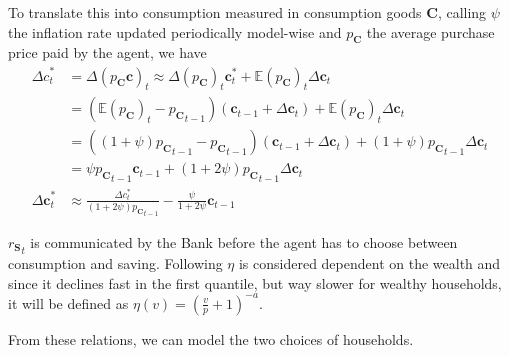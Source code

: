 \documentclass[a4paper, headings=standardclasses]{scrartcl}
\begin{document}
To translate this into consumption measured in consumption goods $\mathbf{C}$, calling $\psi$ the inflation rate updated periodically model-wise and $p_\mathbf{C}$ the average purchase price paid by the agent, we have
\begin{align*}
	{\Delta c}^*_t          & = \Delta (p_\mathbf{C} \mathbf{c})_t \approx \Delta(p_\mathbf{C})_t \mathbf{c}^*_t + \mathbb{E}(p_\mathbf{C})_t {\Delta \mathbf{c}}_t                   \\
	                        & = (\mathbb{E}(p_\mathbf{C})_t - {p_\mathbf{C}}_{t-1}) (\mathbf{c}_{t-1} + {\Delta \mathbf{c}}_t) + \mathbb{E}(p_\mathbf{C})_t {\Delta \mathbf{c}}_t     \\
	                        & = ((1+\psi){p_\mathbf{C}}_{t-1} - {p_\mathbf{C}}_{t-1}) (\mathbf{c}_{t-1} + {\Delta \mathbf{c}}_t) + (1+\psi){p_\mathbf{C}}_{t-1} {\Delta \mathbf{c}}_t \\
	                        & = \psi {p_\mathbf{C}}_{t-1} \mathbf{c}_{t-1} + (1+2\psi){p_\mathbf{C}}_{t-1} {\Delta \mathbf{c}}_t                                                      \\
	{\Delta \mathbf{c}}^*_t & \approx \frac{\Delta c^*_t}{(1+2\psi){p_\mathbf{C}}_{t-1}} - \frac{\psi}{1+2\psi}{\mathbf{c}_{t-1}}
\end{align*}

${r_\mathbf{S}}_t$ is communicated by the Bank before the agent has to choose between consumption and saving. Following \textcite{fisher2020} $\eta$ is considered dependent on the wealth and since it declines fast in the first quantile, but way slower for wealthy households, it will be defined as $\eta(v) = (\frac{v}{p} + 1)^{-a}$.

From these relations, we can model the two choices of households.
\end{document}
